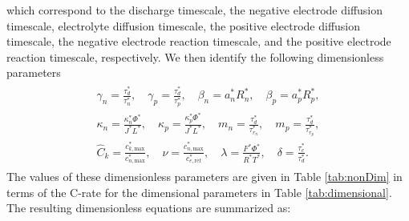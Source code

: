 \documentclass[preprint]{elsarticle}
\begin{document}
which correspond to the discharge timescale, the negative electrode diffusion timescale, electrolyte diffusion timescale, the positive electrode diffusion timescale, the negative electrode reaction timescale, and the positive electrode reaction timescale, respectively. We then identify the following dimensionless parameters
\begin{gather} 
	\begin{split}
	\gamma_n = \frac{\tau_d^*}{\tau_n^*}, \quad \gamma_p = \frac{\tau_d^*}{\tau_p^*}, \quad \beta_n = a_n^*R_n^*, \quad \beta_p = a_p^*R_p^*, \\ 
    \kappa_n = \frac{\kappa_n^* \Phi^*}{J^* L^*}, \quad \kappa_p = \frac{\kappa_p^* \Phi^*}{J^* L^*}, \quad m_n =\frac{\tau_d^*}{\tau_{r_n}^*}, \quad m_p =\frac{\tau_d^*}{\tau_{r_p}^*}, \\ 
    \hat{C}_k=\frac{c_{k,\text{max}}^*}{c_{n,\text{max}}^*}, \quad \nu=\frac{c_{n,\text{max}}^*}{c_{e,\text{ref}}^*}, \quad \lambda=\frac{F^* \Phi^*}{R^* T^*}, \quad \delta = \frac{\tau_e^*}{\tau_{d}^*}.
    \end{split}
\end{gather}
The values of these dimensionless parameters are given in Table \ref{tab:nonDim} in terms of the C-rate for the dimensional parameters in Table \ref{tab:dimensional}. The resulting dimensionless equations are summarized as: 
\end{document}
